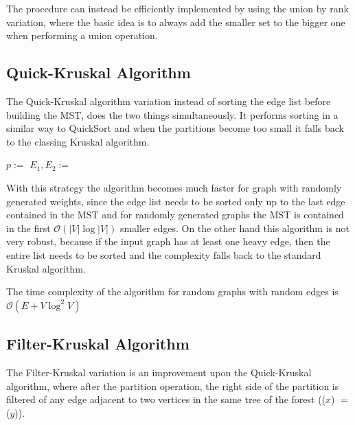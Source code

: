 \documentclass{article}
\begin{document}
The  procedure can instead be efficiently implemented by using the union by rank variation, where the basic idea is to always add the smaller set to the bigger one when performing a union operation.

\subsection{Quick-Kruskal Algorithm}

The Quick-Kruskal algorithm variation instead of sorting the edge list before building the MST, does the two things simultaneously. It performs sorting in a similar way to QuickSort and when the partitions become too small it falls back to the classing Kruskal algorithm.

\begin{algorithm}
    \begin{algorithmic}
                \State \Return {}
            \EndIf
            \State $p := $ 
            \State $E_1, E_2 := $ 
            \State {}
                \State {}
            \EndIf
        \EndFunction
    \end{algorithmic}
\end{algorithm}

With this strategy the algorithm becomes much faster for graph with randomly generated weights, since the edge list needs to be sorted only up to the last edge contained in the MST and for randomly generated graphs the MST is contained in the first $\mathcal{O}(\lvert V\rvert\log \lvert V\rvert)$ smaller edges. On the other hand this algorithm is not very robust, because if the input graph has at least one heavy edge, then the entire list needs to be sorted and the complexity falls back to the standard Kruskal algorithm.

The time complexity of the algorithm for random graphs with random edges is $\mathcal{O}(E + V \log^2 V)$

\subsection{Filter-Kruskal Algorithm}

The Filter-Kruskal variation is an improvement upon the Quick-Kruskal algorithm, where after the partition operation, the right side of the partition is filtered of any edge adjacent to two vertices in the same tree of the forest (($x$) $ = $ ($y$)).
\end{document}
